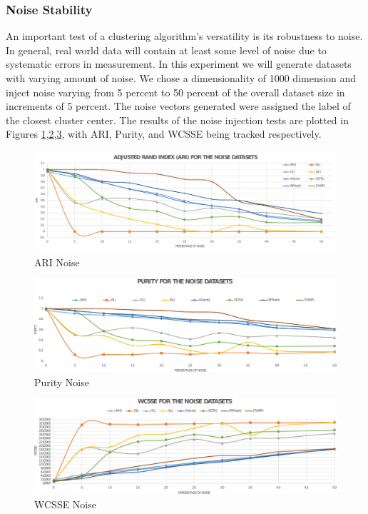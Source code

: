\subsubsection{Noise Stability}

An important test of a clustering algorithm's versatility is its robustness to noise.  In general,
real world data will contain at least some level of noise due to systematic errors in measurement.
In this experiment we will generate datasets with varying amount of noise. We chose a dimensionality
of 1000 dimension and inject noise varying from 5 percent to 50 percent of the overall dataset size
in increments of 5 percent.  The noise vectors generated were assigned the label of the closest
cluster center.  The results of the noise injection tests are plotted in Figures
\ref{noiseacc1},\ref{noiseacc2},\ref{noiseacc3}, with ARI, Purity, and WCSSE being tracked
respectively.

\begin{figure}
    \centering
    \includegraphics[width=1\linewidth]{figs/ari_noise_2} 
    \caption{ARI Noise}\label{noiseacc1} 
\end{figure}
\begin{figure}
    \centering
    \includegraphics[width=1\linewidth]{figs/purity_noise_2} 
    \caption{Purity Noise}\label{noiseacc2} 
\end{figure}
\begin{figure}
    \centering
    \includegraphics[width=1\linewidth]{figs/wcsse_noise_2} 
    \caption{WCSSE Noise}\label{noiseacc3} 
\end{figure}

